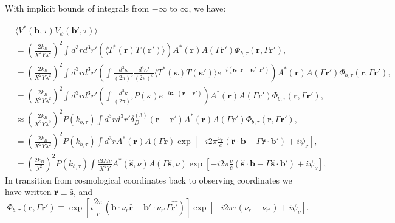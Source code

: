 \documentclass[twocolumn,apj,numberedappendix]{emulateapj}
\renewcommand\[{\begin{equation}}
\renewcommand\]{\end{equation}}
\begin{document}
With implicit bounds of integrals from $-\infty$ to $\infty$, we have:
\begin{widetext}
\begin{equation}
\begin{aligned} & \langle V^{*}(\boldsymbol{b},\tau)V_{\psi}(\boldsymbol{b'},\tau)\rangle\\
 & =\left(\frac{2k_{B}}{X^{2}Y\lambda^{2}}\right)^{2}\int d^{3}rd^{3}r'\left(\langle T^{*}(\boldsymbol{r})T(\boldsymbol{r'})\rangle\right)A^{*}(\boldsymbol{r})A(\Gamma \boldsymbol{r'})\Phi_{b,\tau}(\boldsymbol{r},\Gamma \boldsymbol{r'}),\\
 & =\left(\frac{2k_{B}}{X^{2}Y\lambda^{2}}\right)^{2}\int d^{3}rd^{3}r'\left(\int\frac{d^{3}\kappa}{(2\pi)^{3}}\frac{d^{3}\kappa'}{(2\pi)^{3}}\langle T^{*}(\boldsymbol{\kappa})T(\boldsymbol{\kappa'})\rangle e^{-i(\boldsymbol{\kappa}\cdot \boldsymbol{r}-\boldsymbol{\kappa'}\cdot\boldsymbol{r'})}\right)A^{*}(\boldsymbol{r})A(\Gamma \boldsymbol{r'})\Phi_{b,\tau}(\boldsymbol{r},\Gamma \boldsymbol{r'}),\\
 & =\left(\frac{2k_{B}}{X^{2}Y\lambda^{2}}\right)^{2}\int d^{3}rd^{3}r'\left(\int\frac{d^{3}\kappa}{(2\pi)^{3}}P(\kappa)e^{-i\boldsymbol{\kappa}\cdot(\boldsymbol{r}-\boldsymbol{r'})}\right)A^{*}(\boldsymbol{r})A(\Gamma \boldsymbol{r'})\Phi_{b,\tau}(\boldsymbol{r},\Gamma \boldsymbol{r'}),\\
 & \approx\left(\frac{2k_{B}}{X^{2}Y\lambda^{2}}\right)^{2}P(k_{b,\tau})\int d^{3}rd^{3}r'\delta_{D}^{(3)}(\boldsymbol{r}-\boldsymbol{r'})A^{*}(\boldsymbol{r})A(\Gamma \boldsymbol{r'})\Phi_{b,\tau}(\boldsymbol{r},\Gamma \boldsymbol{r'}),\\
 & =\left(\frac{2k_{B}}{X^{2}Y\lambda^{2}}\right)^{2}P(k_{b,\tau})\int d^{3}rA^{*}(\boldsymbol{r})A(\Gamma \boldsymbol{r})\exp\left[-i2\pi\frac{\nu_{r}}{c}\left(\hat{\boldsymbol{r}}\cdot\boldsymbol{b}-\Gamma \hat{\boldsymbol{r}}\cdot\boldsymbol{b'}\right)+i\psi_{\nu}\right],\\
 & =\left(\frac{2k_{B}}{\lambda^{2}}\right)^{2}P(k_{b,\tau})\int\frac{d\Omega d\nu}{X^{2}Y}A^{*}(\hat{\boldsymbol{s}},\nu)A(\Gamma \hat{\boldsymbol{s}},\nu)\exp\left[-i2\pi\frac{\nu}{c}\left(\hat{\boldsymbol{s}}\cdot\boldsymbol{b}-\Gamma\hat{\boldsymbol{s}}\cdot\boldsymbol{b'}\right)+i\psi_{\nu}\right],
\end{aligned}
\label{eq:main}
\end{equation}
In transition from cosmological coordinates back to observing coordinates we have written $\hat{\boldsymbol{r}}\equiv\hat{\boldsymbol{s}}$, and 
\begin{equation}
\Phi_{b,\tau}(\boldsymbol{r},\Gamma \boldsymbol{r'})\equiv\exp\left[i\frac{2\pi}{c}\left(\boldsymbol{b}\cdot\nu_{r}\hat{\boldsymbol{r}}-\boldsymbol{b'}\cdot\nu_{r'}\Gamma\hat{\boldsymbol{r'}}\right)\right]\exp\left[-i2\pi\tau\left(\nu_{r}-\nu_{r'}\right)+i\psi_{\nu}\right].
\end{equation}
\end{widetext}
\end{document}
